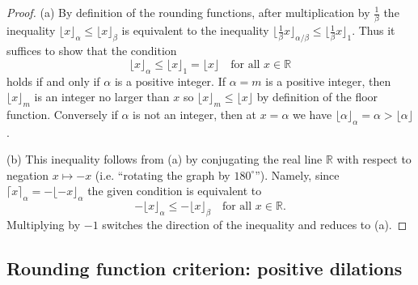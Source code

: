\documentclass[11pt, letterpaper, reqno]{amsart}
\theoremstyle{definition}
\numberwithin{equation}{section}
\newcommand{\RR}{\ensuremath{\mathbb{R}}}
\newcommand{\floor}[1]{\lfloor{#1}\rfloor}
\newcommand{\ceil}[1]{\lceil{#1}\rceil}
\begin{document}
\begin{proof}
(a) By definition of the  rounding functions,  after multiplication by $\frac1{\beta}$ 
the inequality $\floor{x}_\alpha \leq \floor{x}_\beta$ is equivalent to the inequality
 $\floor{\frac1{\beta}x}_{\alpha/\beta} \leq \floor{\frac1{\beta}x}_1$.
Thus it suffices to show that the condition
\begin{equation*}
\floor{x}_\alpha \leq \floor{x}_1 = \floor{x} \quad\text{for all } x\in \RR
\end{equation*}
holds if and only if $\alpha$ is a positive integer.
If $\alpha=m$ is a positive integer, 
then $\floor{x}_m$ is an integer no larger than $x$ so $\floor{x}_m \leq \floor{x}$
by definition of the floor function.
Conversely if $\alpha$ is not an integer, then at $x = \alpha$ we have 
$\floor{\alpha}_\alpha = \alpha > \floor{\alpha}$.

(b) This inequality follows from (a) 
 by conjugating the real line $\RR$ with respect to negation $x \mapsto -x$
(i.e. ``rotating the graph by $180^\circ$'').
Namely, since $\ceil{x}_\alpha = -\floor{-x}_\alpha$ the given condition is equivalent to 
\begin{equation*}
-\floor{x}_\alpha \leq -\floor{x}_\beta \quad\text{for all } x\in \RR.
\end{equation*}
Multiplying by $-1$ switches the direction of the inequality and reduces to (a). 
\end{proof}


\subsection{Rounding function criterion: positive dilations}
\label{subsec:pos-rounding-crit}
\end{document}
